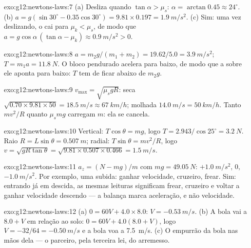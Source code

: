 \begin{solution}{exo:g12:newtons-laws:7}
(a) Desliza quando $\tan\alpha > \mu_s$: $\alpha = \arctan 0.45 \approx
24^\circ$. (b) $a = g(\sin 30^\circ - 0.35\cos 30^\circ) =
9.81 \times 0.197 = \qty{1.9}{m/s^2}$. (c) Sim: uma vez deslizando, o
 cai para $\mu_k < \mu_s$, de modo que
$a = g\cos\alpha\,(\tan\alpha - \mu_k) \approx \qty{0.9}{m/s^2} > 0$.
\end{solution}

\begin{solution}{exo:g12:newtons-laws:8}
$a = m_2 g/(m_1 + m_2) = 19.62/5.0 = \qty{3.9}{m/s^2}$;
$T = m_1 a = \qty{11.8}{N}$. O bloco pendurado acelera para baixo, de
modo que a  sobre ele aponta para baixo: $T$ tem de ficar
abaixo de $m_2 g$.
\end{solution}

\begin{solution}{exo:g12:newtons-laws:9}
$v_{\max} = \sqrt{\mu_s g R}$: seca
$\sqrt{0.70 \times 9.81 \times 50} = \qty{18.5}{m/s} \approx
\qty{67}{km/h}$; molhada $\qty{14.0}{m/s} = \qty{50}{km/h}$. Tanto
$mv^2/R$ quanto $\mu_s mg$ carregam $m$: ela se cancela.
\end{solution}

\begin{solution}{exo:g12:newtons-laws:10}
Vertical: $T\cos\theta = mg$, logo
$T = 2.943/\cos 25^\circ = \qty{3.2}{N}$. Raio $R = L\sin\theta =
\qty{0.507}{m}$; radial: $T\sin\theta = mv^2/R$, logo
$v = \sqrt{gR\tan\theta} = \sqrt{9.81 \times 0.507 \times 0.466}
= \qty{1.5}{m/s}$.
\end{solution}

\begin{solution}{exo:g12:newtons-laws:11}
$a_z = (N - mg)/m$ com $mg = \qty{49.05}{N}$: $+\qty{1.0}{m/s^2}$,
$0$, $-\qty{1.0}{m/s^2}$. Por exemplo, uma subida: ganhar velocidade,
cruzeiro, frear. Sim: entrando já em descida, as mesmas leituras
significam frear, cruzeiro e voltar a ganhar velocidade descendo --- a
balança marca aceleração, e não velocidade.
\end{solution}

\begin{solution}{exo:g12:newtons-laws:12}
(a) $0 = 60V + 4.0 \times 8.0$: $V = \qty{-0.53}{m/s}$.
(b) A bola vai a $8.0 + V$ em relação ao solo:
$0 = 60V + 4.0(8.0 + V)$, logo $V = -32/64 = \qty{-0.50}{m/s}$ e a bola
voa a \qty{7.5}{m/s}. (c) O empurrão da bola nas mãos dela --- o
parceiro, pela terceira lei, do arremesso.
\end{solution}

